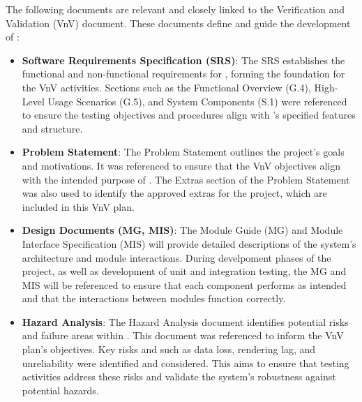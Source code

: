 \documentclass[12pt, titlepage]{article}
\begin{document}



\noindent The following documents are relevant and closely linked to the Verification
and Validation (VnV) document. These documents define and guide the development of 
\progname{}:

\begin{itemize}
  \item \textbf{Software Requirements Specification (SRS)}: 
  The SRS establishes the functional and non-functional requirements for \progname{},
  forming the foundation for the VnV activities. Sections such as the Functional 
  Overview (G.4), High-Level Usage Scenarios (G.5), and System Components (S.1) were
  referenced to ensure the testing objectives and procedures align with \progname{}'s
  specified features and structure.
  \item \textbf{Problem Statement}:
  The Problem Statement outlines the project's goals and motivations. It was referenced
  to ensure that the VnV objectives align with the intended purpose of \progname{}. The 
  Extras section of the Problem Statement was also used to identify the approved extras 
  for the project, which are included in this VnV plan.
  \item \textbf{Design Documents (MG, MIS)}:
  The Module Guide (MG) and Module Interface Specification (MIS) will provide detailed
  descriptions of the system's architecture and module interactions. During develpoment
  phases of the project, as well as development of unit and integration testing, the 
  MG and MIS will be referenced to ensure that each component performs as intended and
  that the interactions between modules function correctly.
  \item \textbf{Hazard Analysis}:
  The Hazard Analysis document identifies potential risks and failure areas within
  \progname{}. This document was referenced to inform the VnV plan's objectives. Key 
  risks and such as data loss, rendering lag, and unreliability were identified and 
  considered. This aims to ensure that testing activities address these risks and 
  validate the system's robustness against potential hazards. 
\end{itemize}
\end{document}
